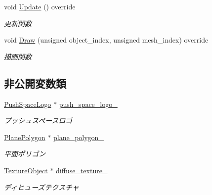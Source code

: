 \begin{DoxyCompactItemize}
void \mbox{\hyperlink{class_push_space_logo_draw_a75248e42d5b677c81169be478b59141f}{Update}} () override
\begin{DoxyCompactList}\small\item\em 更新関数 \end{DoxyCompactList}\item 
void \mbox{\hyperlink{class_push_space_logo_draw_a647dddefc43d66cb3c720ee8fbb6a783}{Draw}} (unsigned object\+\_\+index, unsigned mesh\+\_\+index) override
\begin{DoxyCompactList}\small\item\em 描画関数 \end{DoxyCompactList}\end{DoxyCompactItemize}
\subsection*{非公開変数類}
\begin{DoxyCompactItemize}
\item 
\mbox{\hyperlink{class_push_space_logo}{Push\+Space\+Logo}} $\ast$ \mbox{\hyperlink{class_push_space_logo_draw_a3ebb51a15f132233275cfddaf3ded360}{push\+\_\+space\+\_\+logo\+\_\+}}
\begin{DoxyCompactList}\small\item\em プッシュスペースロゴ \end{DoxyCompactList}\item 
\mbox{\hyperlink{class_plane_polygon}{Plane\+Polygon}} $\ast$ \mbox{\hyperlink{class_push_space_logo_draw_ab65304ed129c8bb3aa2f599d27b8783a}{plane\+\_\+polygon\+\_\+}}
\begin{DoxyCompactList}\small\item\em 平面ポリゴン \end{DoxyCompactList}\item 
\mbox{\hyperlink{class_texture_object}{Texture\+Object}} $\ast$ \mbox{\hyperlink{class_push_space_logo_draw_a11dfc585346333efcf717aa63f7edefd}{diffuse\+\_\+texture\+\_\+}}
\begin{DoxyCompactList}\small\item\em ディヒューズテクスチャ \end{DoxyCompactList}\end{DoxyCompactItemize}
